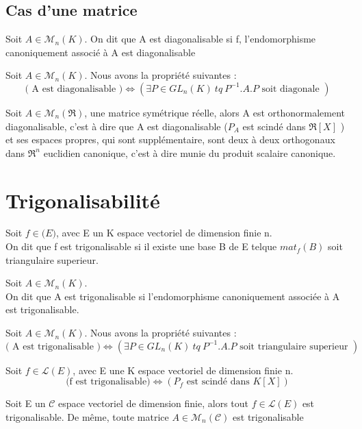 \subsection{Cas d'une matrice}
\begin{de}
Soit $A \in \mathcal{M}_n(K)$. On dit que A est diagonalisable si f, l'endomorphisme canoniquement associé à A est diagonalisable
\end{de}
\begin{prop}
Soit $A \in \mathcal{M}_n(K)$. Nous avons la propriété suivantes : 
$$\mbox{( A est diagonalisable )} \Leftrightarrow (\exists P \in GL_n(K)~ tq~ P^{-1}.A.P \mbox{ soit diagonale })$$
\end{prop}
\begin{theo}
Soit $A \in \mathcal{M}_n(\Re)$, une matrice symétrique réelle, alors A est orthonormalement diagonalisable, c'est à dire que A est diagonalisable ($P_A$ est scindé dans $\Re[X]$ ) et ses espaces propres, qui sont supplémentaire, sont deux à deux orthogonaux dans $\Re^n$ euclidien canonique, c'est à dire munie du produit scalaire canonique. 
\end{theo}
\section{Trigonalisabilité}
\begin{de}
Soit $f \in \mathcal(E)$, avec E un K espace vectoriel de dimension finie n.\\
On dit que f est trigonalisable si il existe une base B de E telque $mat_f(B)$ soit triangulaire superieur.
\end{de}
\begin{de}
Soit $A \in \mathcal{M}_n(K)$.\\
On dit que A est trigonalisable si l'endomorphisme canoniquement associée à A est trigonalisable.
\end{de}
\begin{prop}
Soit $A \in \mathcal{M}_n(K)$. Nous avons la propriété suivantes : 
$$\mbox{( A est trigonalisable )} \Leftrightarrow (\exists P \in GL_n(K)~ tq~ P^{-1}.A.P \mbox{ soit triangulaire superieur })$$
\end{prop}
\begin{theo}
Soit $f \in \mathcal{L}(E)$, avec E une K espace vectoriel de dimension finie n.\\
$$\mbox{(f est trigonalisable)} \Leftrightarrow (P_f \mbox{ est scindé dans } K[X])$$
\end{theo}
\begin{corr}
Soit E un $\mathcal{C}$ espace vectoriel de dimension finie, alors tout $f \in \mathcal{L}(E)$ est trigonalisable.
De même, toute matrice $A \in \mathcal{M}_n(\mathcal{C})$ est trigonalisable
\end{corr}

